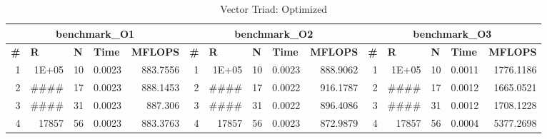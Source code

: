\begin{table}[htbp]
	\centering
	\caption{Vector Triad: Optimized}
	\begin{tabular}{|r|r|r|r|r|r|r|r|r|r|r|r|r|r|r|}
		\toprule
		\multicolumn{5}{|c|}{\textbf{benchmark\_O1        }} & \multicolumn{5}{c|}{\textbf{benchmark\_O2        }} & \multicolumn{5}{c|}{\textbf{benchmark\_O3        }} \\
		\midrule
		\multicolumn{1}{|l|}{\textbf{\#}} & \multicolumn{1}{l|}{\textbf{R}} & \multicolumn{1}{l|}{\textbf{N}} & \multicolumn{1}{l|}{\textbf{Time}} & \multicolumn{1}{l|}{\textbf{MFLOPS}} & \multicolumn{1}{l|}{\textbf{\#}} & \multicolumn{1}{l|}{\textbf{R}} & \multicolumn{1}{l|}{\textbf{N}} & \multicolumn{1}{l|}{\textbf{Time}} & \multicolumn{1}{l|}{\textbf{MFLOPS}} & \multicolumn{1}{l|}{\textbf{\#}} & \multicolumn{1}{l|}{\textbf{R}} & \multicolumn{1}{l|}{\textbf{N}} & \multicolumn{1}{l|}{\textbf{Time}} & \multicolumn{1}{l|}{\textbf{MFLOPS}} \\
		\midrule
		1                                 & 1E+05                           & 10                              & 0.0023                             & 883.7556                             & 1                                & 1E+05                           & 10                              & 0.0023                             & 888.9062                             & 1  & 1E+05    & 10    & 0.0011 & 1776.1186 \\
		\midrule
		2                                 & \#\#\#\#                        & 17                              & 0.0023                             & 888.1453                             & 2                                & \#\#\#\#                        & 17                              & 0.0022                             & 916.1787                             & 2  & \#\#\#\# & 17    & 0.0012 & 1665.0521 \\
		\midrule
		3                                 & \#\#\#\#                        & 31                              & 0.0023                             & 887.306                              & 3                                & \#\#\#\#                        & 31                              & 0.0022                             & 896.4086                             & 3  & \#\#\#\# & 31    & 0.0012 & 1708.1228 \\
		\midrule
		4                                 & 17857                           & 56                              & 0.0023                             & 883.3763                             & 4                                & 17857                           & 56                              & 0.0023                             & 872.9879                             & 4  & 17857    & 56    & 0.0004 & 5377.2698 \\

\end{tabular}
\end{table}
